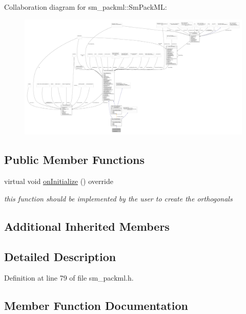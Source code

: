 Collaboration diagram for sm\+\_\+packml\+:\+:Sm\+Pack\+ML\+:
\nopagebreak
\begin{figure}[H]
\begin{center}
\leavevmode
\includegraphics[width=350pt]{structsm__packml_1_1SmPackML__coll__graph}
\end{center}
\end{figure}
\subsection*{Public Member Functions}
\begin{DoxyCompactItemize}
\item 
virtual void \hyperlink{structsm__packml_1_1SmPackML_a977b226f0602ce502cd3678f9066a450}{on\+Initialize} () override
\begin{DoxyCompactList}\small\item\em this function should be implemented by the user to create the orthogonals \end{DoxyCompactList}\end{DoxyCompactItemize}
\subsection*{Additional Inherited Members}


\subsection{Detailed Description}


Definition at line 79 of file sm\+\_\+packml.\+h.



\subsection{Member Function Documentation}
\mbox{\label{structsm__packml_1_1SmPackML_a977b226f0602ce502cd3678f9066a450}} 

